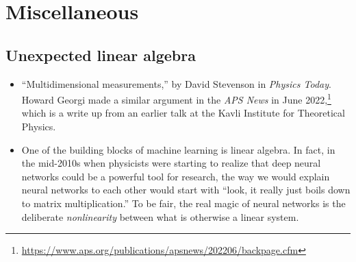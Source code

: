 \documentclass[12pt, oneside]{report}    %
\let\oldsection\section
\def\section{%
  \setcounter{sidenote}{1}%
  \oldsection
}
\begin{document}



\chapter{Miscellaneous}

\section{Unexpected linear algebra}

\begin{itemize}
    \item ``Multidimensional measurements,'' by David Stevenson in \emph{Physics Today}\autocite{10.1063/pt.ogyk.yscx}. Howard Georgi made a similar argument in the \emph{APS News} in June 2022,\footnote{\url{https://www.aps.org/publications/apsnews/202206/backpage.cfm}} which is a write up from an earlier talk at the Kavli Institute for Theoretical Physics\autocite{Georgi:2022jfv}.

    \item One of the building blocks of machine learning is linear algebra. In fact, in the mid-2010s when physicists were starting to realize that deep neural networks could be a powerful tool for research, the way we would explain neural networks to each other would start with ``look, it really just boils down to matrix multiplication.'' To be fair, the real magic of neural networks is the deliberate \emph{nonlinearity} between what is otherwise a linear system. 
\end{itemize}

\printindex

% 
\end{document}
